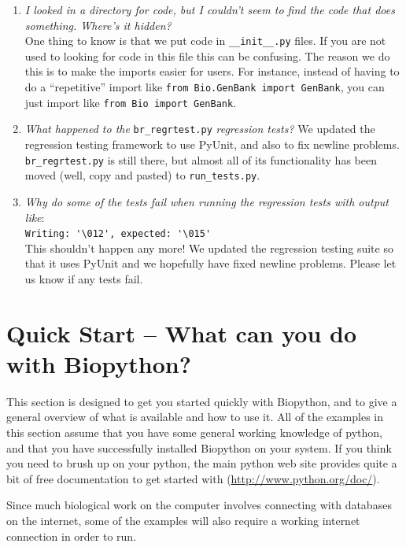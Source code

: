 \documentclass{report}
\begin{document}
\begin{enumerate}
  \item \emph{I looked in a directory for code, but I couldn't seem to find the code that does something. Where's it hidden?} \\
  One thing to know is that we put code in \verb|__init__.py| files. If you are not used to looking for code in this file this can be confusing. The reason we do this is to make the imports easier for users. For instance, instead of having to do a ``repetitive'' import like \verb|from Bio.GenBank import GenBank|, you can just import like \verb|from Bio import GenBank|.

  \item \emph{What happened to the} \verb|br_regrtest.py| \emph{regression tests?}
  We updated the regression testing framework to use PyUnit, and also to fix newline problems. \verb|br_regrtest.py| is still there, but almost all of its functionality has been moved (well, copy and pasted) to \verb|run_tests.py|.

  \item \emph{Why do some of the tests fail when running the regression tests with output like}: \\
\verb|Writing: '\012', expected: '\015'| \\
 This shouldn't happen any more! We updated the regression testing suite so that it uses PyUnit and we hopefully have fixed newline problems. Please let us know if any tests fail.
\end{enumerate}

\chapter{Quick Start -- What can you do with Biopython?}

This section is designed to get you started quickly with Biopython, and to give a general overview of what is available and how to use it. All of the examples in this section assume that you have some general working knowledge of python, and that you have successfully installed Biopython on your system. If you think you need to brush up on your python, the main python web site provides quite a bit of free documentation to get started with (\url{http://www.python.org/doc/}). 

 
Since much biological work on the computer involves connecting with databases on the internet, some of the examples will also require a working internet connection in order to run. 
\end{document}
